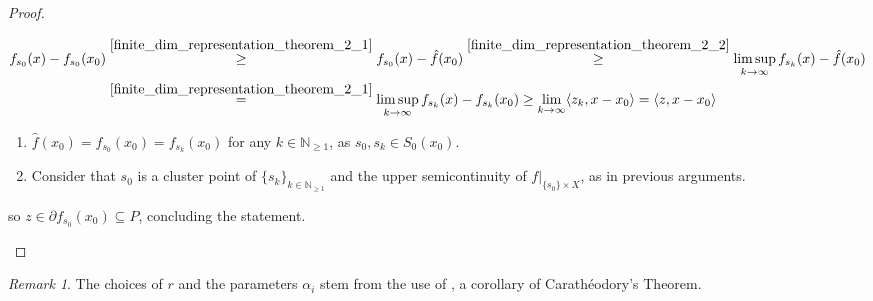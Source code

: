 \documentclass[10pt, leqno]{amsart}
\theoremstyle{definition}
\theoremstyle{remark}
\newtheorem{remark}[theorem]{Remark}
\begin{document}
\begin{proof}
\begin{enumerate}[label=(\alph*), wide]
\begin{align}
                f_{s_0}(x)-f_{s_0}(x_0) &\overset{\ref{finite_dim_representation_theorem_2_1}}{\geq} f_{s_0}(x)-\hat{f}(x_0) \overset{\ref{finite_dim_representation_theorem_2_2}}{\geq} \limsup_{k \to \infty} f_{s_k}(x) - \hat{f}(x_0)\\
                &\overset{\ref{finite_dim_representation_theorem_2_1}}{=} \limsup_{k \to \infty} f_{s_k}(x)-f_{s_k}(x_0) \geq \lim_{k \to \infty} \langle z_k, x-x_0 \rangle = \langle z, x-x_0 \rangle
            \end{align}
            \begin{enumerate}[label=(\arabic*), wide]
                \item \label{finite_dim_representation_theorem_2_1} \(\hat{f}(x_0) = f_{s_0}(x_0) = f_{s_k}(x_0)\) for any \(k \in \mathbb{N}_{\geq 1}\), as \(s_0, s_k \in S_0(x_0)\).
                \item \label{finite_dim_representation_theorem_2_2} Consider that \(s_0\) is a cluster point of \(\{s_k\}_{k \in \mathbb{N}_{\geq 1}}\) and the upper semicontinuity of \(f|_{\{s_0\} \times X}\), as in previous arguments.
            \end{enumerate}
            so \(z \in \partial f_{s_0}(x_0) \subseteq P\), concluding the statement.
        \end{enumerate}
    \end{proof}

    \begin{remark}
        The choices of \(r\) and the parameters \(\alpha_i\) stem from the use of , a corollary of Carathéodory's Theorem.
    \end{remark}

    \printbibliography{}
\end{document}
